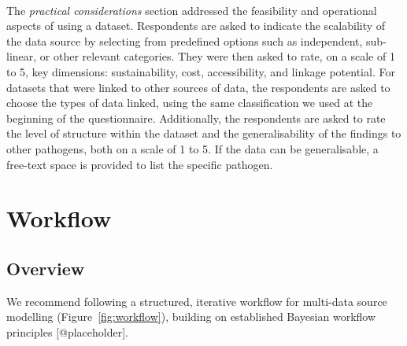 \documentclass{article}
\begin{document}
\paragraph{}The \textit{practical considerations} section addressed the feasibility and operational aspects of using a dataset. Respondents are asked to indicate the scalability of the data source by selecting from predefined options such as independent, sub-linear, or other relevant categories. They were then asked to rate, on a scale of 1 to 5, key dimensions: sustainability, cost, accessibility, and linkage potential. For datasets that were linked to other sources of data, the respondents are asked to choose the types of data linked, using the same classification we used at the beginning of the questionnaire.  Additionally, the respondents are asked to rate the level of structure within the dataset and the generalisability of the findings to other pathogens, both on a scale of 1 to 5. If the data can be generalisable, a free-text space is provided to list the specific pathogen. 



\section{Workflow}

\subsection{Overview}

We recommend following a structured, iterative workflow for multi-data source modelling (Figure~\ref{fig:workflow}), building on established Bayesian workflow principles [@placeholder].
\end{document}
